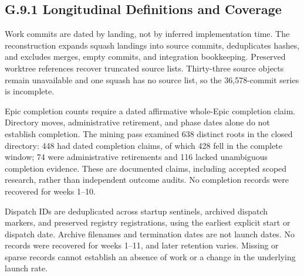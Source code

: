 \subsection{G.9.1 Longitudinal Definitions and Coverage}\label{heading:seip-longitudinal-protocol}

Work commits are dated by landing, not by inferred implementation time. The reconstruction expands squash landings into source commits, deduplicates hashes, and excludes merges, empty commits, and integration bookkeeping. Preserved worktree references recover truncated source lists. Thirty-three source objects remain unavailable and one squash has no source list, so the 36,578-commit series is incomplete.

Epic completion counts require a dated affirmative whole-Epic completion claim. Directory moves, administrative retirement, and phase dates alone do not establish completion. The mining pass examined 638 distinct roots in the closed directory: 448 had dated completion claims, of which 428 fell in the complete window; 74 were administrative retirements and 116 lacked unambiguous completion evidence. These are documented claims, including accepted scoped research, rather than independent outcome audits. No completion records were recovered for weeks 1--10.

Dispatch IDs are deduplicated across startup sentinels, archived dispatch markers, and preserved registry registrations, using the earliest explicit start or dispatch date. Archive filenames and termination dates are not launch dates. No records were recovered for weeks 1--11, and later retention varies. Missing or sparse records cannot establish an absence of work or a change in the underlying launch rate.

